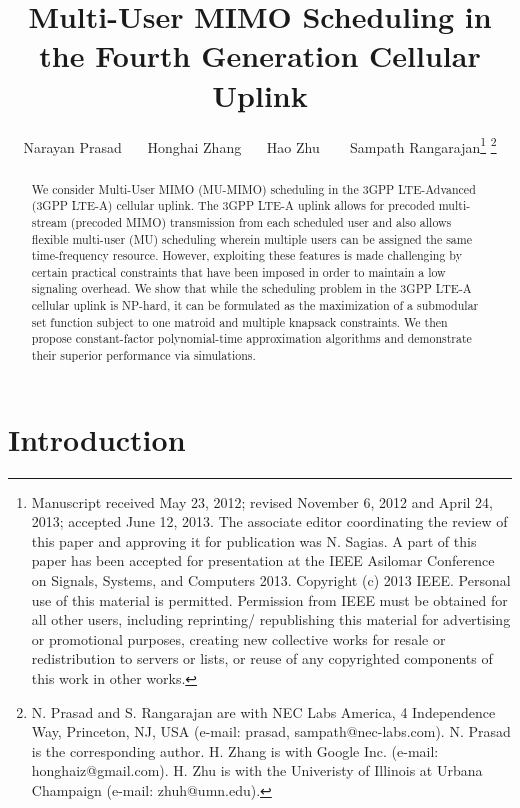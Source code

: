 \documentclass[11pt] {article}
\begin{document}
\title{Multi-User MIMO Scheduling in the Fourth Generation Cellular Uplink}


\author{Narayan Prasad ~~~Honghai Zhang ~~~Hao Zhu ~~~
Sampath Rangarajan\thanks{Manuscript received May 23, 2012; revised November 6, 2012 and April
24, 2013; accepted June 12, 2013. The associate editor coordinating the review
of this paper and approving it for publication was N. Sagias.
A part of this paper has been accepted for presentation at the IEEE Asilomar
Conference on Signals, Systems, and Computers 2013. Copyright (c) 2013 IEEE. Personal use of this material is permitted. Permission from IEEE must be obtained for all other users, including reprinting/ republishing this material for advertising or promotional purposes, creating new collective works for resale or redistribution to servers or lists, or reuse of any copyrighted components of this work in other works.}
\thanks{ N. Prasad and S. Rangarajan are with NEC Labs America, 4 Independence
Way, Princeton, NJ, USA (e-mail: {prasad, sampath}@nec-labs.com). N.
Prasad is the corresponding author.
H. Zhang is with Google Inc. (e-mail: honghaiz@gmail.com).
H. Zhu is with the Univeristy of Illinois at Urbana Champaign (e-mail:
zhuh@umn.edu).}}

\date{}
\maketitle
\begin{abstract}
We consider Multi-User MIMO (MU-MIMO) scheduling in  the 3GPP LTE-Advanced (3GPP LTE-A) cellular uplink.   The 3GPP LTE-A  uplink  allows for precoded multi-stream (precoded MIMO) transmission from each scheduled user and also allows flexible multi-user (MU) scheduling wherein multiple users can be assigned the same time-frequency resource. However, exploiting these features is made challenging by   certain practical constraints that have been imposed in order to maintain a low signaling overhead. We show that while the scheduling problem in the 3GPP LTE-A cellular uplink is NP-hard, it can be formulated as the maximization of a submodular set function subject to one matroid and multiple knapsack constraints.    We then propose constant-factor polynomial-time   approximation  algorithms and demonstrate their superior performance via simulations.




\end{abstract}
\newpage

\section{Introduction}
\end{document}
